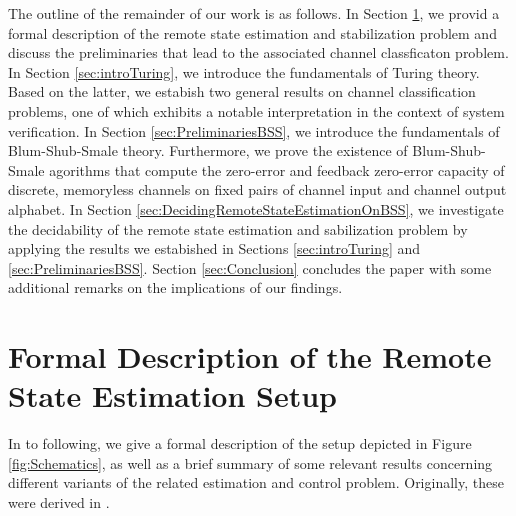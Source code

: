 \documentclass[conference]{IEEEtran}
\begin{document}
	The outline of the remainder of our work is as follows. In Section \ref{sec:FormalEstimationSetup}, we provid a formal description of the remote state estimation and stabilization problem
	and discuss the preliminaries that lead to the associated channel classficaton problem. In Section \ref{sec:introTuring}, we introduce the fundamentals of Turing theory.
	Based on the latter, we estabish two general results on channel classification problems, one of which exhibits a notable interpretation in the context of system verification. 
	In Section \ref{sec:PreliminariesBSS}, we introduce the fundamentals of Blum-Shub-Smale theory. Furthermore, we prove the existence of 
	Blum-Shub-Smale agorithms that compute the zero-error and feedback zero-error capacity of discrete, memoryless channels on fixed pairs of channel input and channel output alphabet. 
	In Section \ref{sec:DecidingRemoteStateEstimationOnBSS}, we investigate the decidability of the remote state estimation and sabilization problem 
	by applying the results we estabished in Sections \ref{sec:introTuring} and \ref{sec:PreliminariesBSS}. Section \ref{sec:Conclusion} concludes the paper with some additional 
	remarks on the implications of our findings. 
                                                                        
\section{Formal Description of the Remote State Estimation Setup}	\label{sec:FormalEstimationSetup}
	\noindent In to following, we give a formal description of the setup depicted in Figure \ref{fig:Schematics}, as well as a brief summary of 
	some relevant results concerning different variants of the related estimation and control problem. Originally, these were derived in \cite{MS07, MS07SC}.  
	
\end{document}
